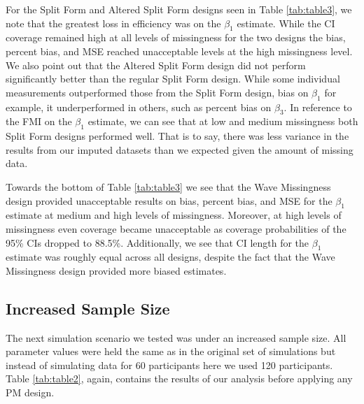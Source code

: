 \documentclass{svjour3}                     %
\begin{document}
For the Split Form and Altered Split Form designs seen in Table \ref{tab:table3}, we note that the greatest loss in efficiency was on the $\beta_1$ estimate. While the CI coverage remained high at all levels of missingness for the two designs the bias, percent bias, and MSE reached unacceptable levels at the high missingness level. We also point out that the Altered Split Form design did not perform significantly better than the regular Split Form design. While some individual measurements outperformed those from the Split Form design, bias on $\beta_1$ for example, it underperformed in others, such as percent bias on $\beta_3$. In reference to the FMI on the $\beta_1$ estimate, we can see that at low and medium missingness both Split Form designs performed well. That is to say, there was less variance in the results from our imputed datasets than we expected given the amount of missing data.\par

Towards the bottom of Table \ref{tab:table3} we see that the Wave Missingness design provided unacceptable results on bias, percent bias, and MSE for the $\beta_1$ estimate at medium and high levels of missingness. Moreover, at high levels of missingness even coverage became unacceptable as coverage probabilities of the 95\% CIs dropped to 88.5\%.  Additionally, we see that CI length for the $\beta_1$ estimate was roughly equal across all designs, despite the fact that the Wave Missingness design provided more biased estimates. \par

\subsection{Increased Sample Size}
\label{sec:3.2}
The next simulation scenario we tested was under an increased sample size. All parameter values were held the same as in the original set of simulations but instead of simulating data for 60 participants here we used 120 participants. Table \ref{tab:table2}, again, contains the results of our analysis before applying any PM design. \par
\end{document}
